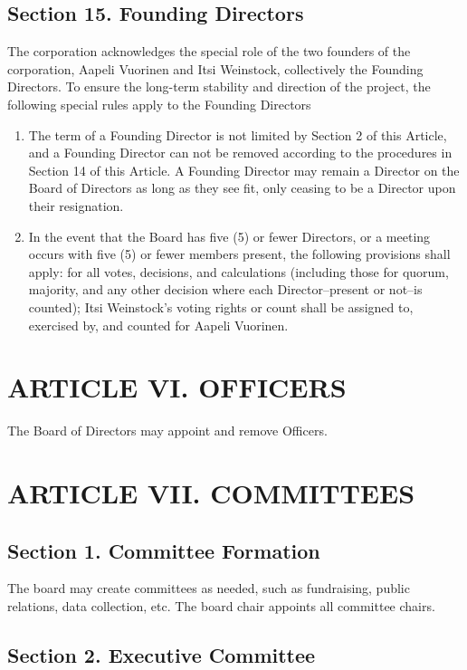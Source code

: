 \documentclass[a4paper]{article}
\begin{document}
\subsection*{Section 15. Founding Directors}

The corporation acknowledges the special role of the two founders of the corporation, Aapeli Vuorinen and Itsi Weinstock, collectively the Founding Directors. To ensure the long-term stability and direction of the project, the following special rules apply to the Founding Directors

\begin{enumerate}
\item The term of a Founding Director is not limited by Section 2 of this Article, and a Founding Director can not be removed according to the procedures in Section 14 of this Article. A Founding Director may remain a Director on the Board of Directors as long as they see fit, only ceasing to be a Director upon their resignation.
\item In the event that the Board has five (5) or fewer Directors, or a meeting occurs with five (5) or fewer members present, the following provisions shall apply: for all votes, decisions, and calculations (including those for quorum, majority, and any other decision where each Director--present or not--is counted); Itsi Weinstock's voting rights or count shall be assigned to, exercised by, and counted for Aapeli Vuorinen.
\end{enumerate}

\section*{ARTICLE VI. OFFICERS}

The Board of Directors may appoint and remove Officers.

\section*{ARTICLE VII. COMMITTEES}


\subsection*{Section 1. Committee Formation}

The board may create committees as needed, such as fundraising, public relations, data collection, etc. The board chair appoints all committee chairs.

\subsection*{Section 2. Executive Committee}
\end{document}
